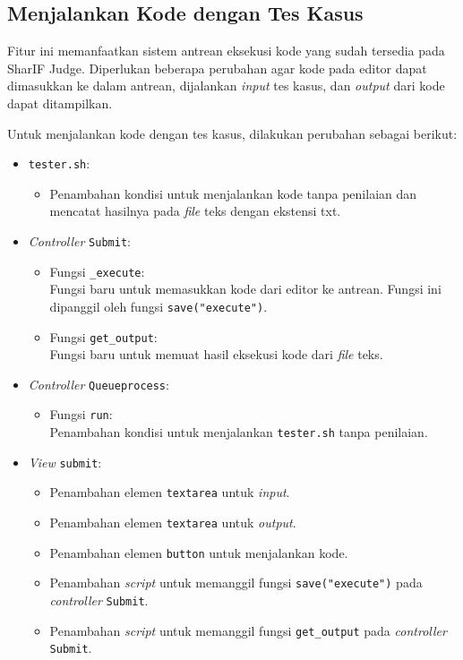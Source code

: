 \subsection{Menjalankan Kode dengan Tes Kasus}
\label{subsec:4:jalan}

Fitur ini memanfaatkan sistem antrean eksekusi kode yang sudah tersedia pada SharIF Judge.
Diperlukan beberapa perubahan agar kode pada editor dapat dimasukkan ke dalam antrean, dijalankan \textit{input} tes kasus, dan \textit{output} dari kode dapat ditampilkan.

Untuk menjalankan kode dengan tes kasus, dilakukan perubahan sebagai berikut:
\begin{itemize}
	\item \verb|tester.sh|:
    \begin{itemize}
        \item Penambahan kondisi untuk menjalankan kode tanpa penilaian dan mencatat hasilnya pada \textit{file} teks dengan ekstensi txt.
    \end{itemize}
	\item \textit{Controller} \verb|Submit|:
    \begin{itemize}
        \item Fungsi \verb|_execute|: \\ Fungsi baru untuk memasukkan kode dari editor ke antrean. Fungsi ini dipanggil oleh fungsi \verb|save("execute")|.
        \item Fungsi \verb|get_output|: \\ Fungsi baru untuk memuat hasil eksekusi kode dari \textit{file} teks.
    \end{itemize}
	\item \textit{Controller} \verb|Queueprocess|:
    \begin{itemize}
        \item Fungsi \verb|run|: \\ Penambahan kondisi untuk menjalankan \verb|tester.sh| tanpa penilaian.
    \end{itemize}
    \item \textit{View} \verb|submit|:
    \begin{itemize}
		\item Penambahan elemen \verb|textarea| untuk \textit{input}.
		\item Penambahan elemen \verb|textarea| untuk \textit{output}.
        \item Penambahan elemen \verb|button| untuk menjalankan kode.
        \item Penambahan \textit{script} untuk memanggil fungsi \verb|save("execute")| pada \textit{controller} \verb|Submit|.
        \item Penambahan \textit{script} untuk memanggil fungsi \verb|get_output| pada \textit{controller} \verb|Submit|.
    \end{itemize}
\end{itemize}

